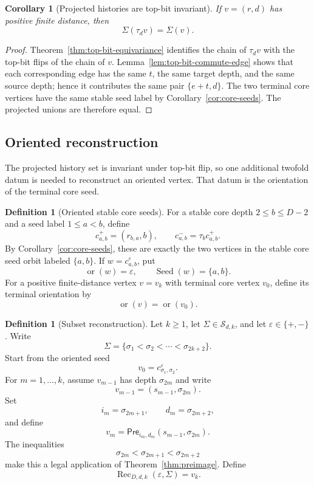 \documentclass[11pt]{article}
\newtheorem{corollary}[theorem]{Corollary}
\theoremstyle{definition}
\newtheorem{definition}[theorem]{Definition}
\theoremstyle{remark}
\newcommand{\Pre}{\mathsf{Pre}}
\newcommand{\Sfam}{\mathcal S}
\newcommand{\Seed}{\operatorname{Seed}}
\begin{document}
\begin{corollary}[Projected histories are top-bit invariant]\label{cor:history-top-bit-invariant}
If $v=(r,d)$ has positive finite distance, then
\[
\Sigma(\tau_dv)=\Sigma(v).
\]
\end{corollary}

\begin{proof}
Theorem~\ref{thm:top-bit-equivariance} identifies the chain of $\tau_dv$ with the top-bit flips of the chain of $v$.  Lemma~\ref{lem:top-bit-commute-edge} shows that each corresponding edge has the same $t$, the same target depth, and the same source depth; hence it contributes the same pair $\{e+t,d\}$.  The two terminal core vertices have the same stable seed label by Corollary~\ref{cor:core-seeds}.  The projected unions are therefore equal.
\end{proof}

\subsection{Oriented reconstruction}

The projected history set is invariant under top-bit flip, so one additional twofold datum is needed to reconstruct an oriented vertex.  That datum is the orientation of the terminal core seed.

\begin{definition}[Oriented stable core seeds]\label{def:oriented-core-seeds}
For a stable core depth $2\le b\le D-2$ and a seed label $1\le a<b$, define
\[
c^+_{a,b}=(r_{b,a},b),
\qquad
c^-_{a,b}=\tau_b c^+_{a,b}.
\]
By Corollary~\ref{cor:core-seeds}, these are exactly the two vertices in the stable core seed orbit labeled $\{a,b\}$.  If $w=c^\varepsilon_{a,b}$, put
\[
\operatorname{or}(w)=\varepsilon,
\qquad
\Seed(w)=\{a,b\}.
\]
For a positive finite-distance vertex $v=v_k$ with terminal core vertex $v_0$, define its terminal orientation by
\[
\operatorname{or}(v)=\operatorname{or}(v_0).
\]
\end{definition}

\begin{definition}[Subset reconstruction]\label{def:subset-reconstruction}
Let $k\ge1$, let $\Sigma\in\Sfam_{d,k}$, and let $\varepsilon\in\{+,-\}$.  Write
\[
\Sigma=\{\sigma_1<\sigma_2<\cdots<\sigma_{2k+2}\}.
\]
Start from the oriented seed
\[
v_0=c^\varepsilon_{\sigma_1,\sigma_2}.
\]
For $m=1,\ldots,k$, assume $v_{m-1}$ has depth $\sigma_{2m}$ and write
\[
v_{m-1}=(s_{m-1},\sigma_{2m}).
\]
Set
\[
i_m=\sigma_{2m+1},
\qquad
 d_m=\sigma_{2m+2},
\]
and define
\[
v_m=\Pre_{i_m,d_m}(s_{m-1},\sigma_{2m}).
\]
The inequalities
\[
\sigma_{2m}<\sigma_{2m+1}<\sigma_{2m+2}
\]
make this a legal application of Theorem~\ref{thm:preimage}.  Define
\[
\operatorname{Rec}_{D,d,k}(\varepsilon,\Sigma)=v_k.
\]
\end{definition}
\end{document}
